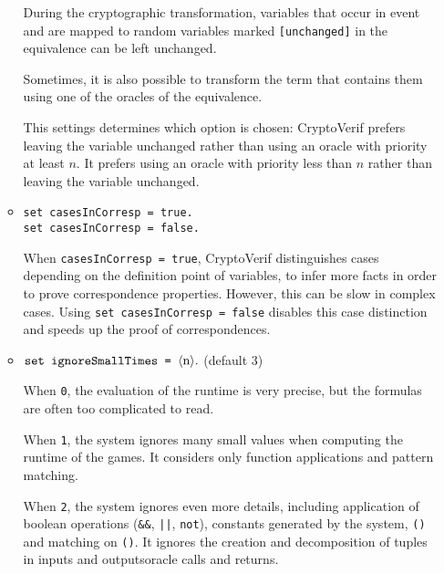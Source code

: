 \begin{itemize}
\begin{itemize}
During the cryptographic transformation, variables that occur in event
and are mapped to random variables marked \texttt{[unchanged]} in the
equivalence can be left unchanged.

Sometimes, it is also possible to transform the term that contains
them using one of the oracles of the equivalence.

This settings determines which option is chosen: CryptoVerif prefers
leaving the variable unchanged rather than using an oracle with
priority at least $n$. It prefers using an oracle with priority
less than $n$ rather than leaving the variable unchanged.

\item \texttt{set casesInCorresp = true.}\\
\texttt{set casesInCorresp = false.}

When \texttt{casesInCorresp = true}, CryptoVerif distinguishes
cases depending on the definition point of variables, to infer
more facts in order to prove correspondence properties.
However, this can be slow in complex cases. Using
\texttt{set casesInCorresp = false} disables this case
distinction and speeds up the proof of correspondences.

% 

\item $\texttt{set ignoreSmallTimes = }\langle\textrm{n}\rangle{\tt .}$ (default 3)

When {\tt 0}, the evaluation of the runtime is very precise,
but the formulas are often too complicated to read.

When {\tt 1}, the system ignores many small values when computing
the runtime of the games. It considers only function applications
and pattern matching.

When {\tt 2}, the system ignores even more details, including
application of boolean operations (\texttt{\&\&},
\texttt{\string|\string|}, \texttt{not}), constants generated by the
system, \texttt{()} and matching on \texttt{()}. It ignores the
creation and decomposition of tuples in \ifchannels
inputs and outputs\else oracle calls and returns\fi.


\end{itemize}
\end{itemize}
